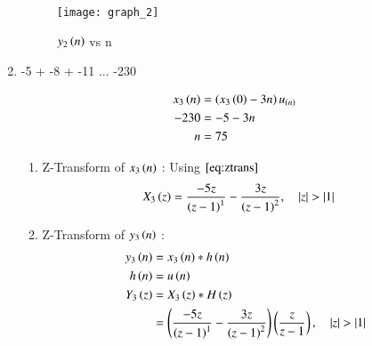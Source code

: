 \documentclass[journal,12pt,onecolumn]{IEEEtran}
\theoremstyle{remark}
\begin{document}
\begin{enumerate}
\begin{enumerate}
\end{enumerate}



\begin{figure}[h!]
\centering
  \graphicspath{ {figs/} }
\texttt{[image: graph\_2]}
\caption{$y_2\left(n\right)$ vs n }
\label{graph:ee25-g3}
\end{figure}

\vspace{0.5cm} 
\item
-5 + -8 + -11 ... -230
\vspace{0.5cm}

\begin{align}
x_3\left(n\right) &= \left(x_3\left(0\right) -3n\right)u_{\left(n\right)}\\
-230 &= -5 -3n \\
n &= 75
\end{align}
\begin{enumerate}
\item
Z-Transform of $x_3\left(n\right)$ :
Using $\eqref{eq:ztrans}$
\begin{align}
X_3\left(z\right) &=  \frac{-5z}{\left(z-1\right)^{1}} -
       \frac{3z}{\left(z-1\right)^{2}} \label{eq:ee25-8}
,\quad \left\vert z\right\vert>\left\vert1\right\vert 
\end{align}

    \vspace{0.5cm}
\item
Z-Transform of $y_3\left(n\right)$ :
\begin{align}
    y_3\left(n\right) &= x_3\left(n\right) * h\left(n\right) \\
         h\left(n\right) &= u\left(n\right) \\
    Y_3\left(z\right) &= X_3\left(z\right) * H\left(z\right)\\
             &= \left(\frac{-5z}{{\left(z-1\right)^1}}-
       \frac{3z}{\left(z-1\right)^2}\right)\left(\frac{z}{z-1}\right)
,\quad \left\vert z\right\vert>\left\vert1\right\vert 
    \end{align}


\end{enumerate}
\end{enumerate}
\end{document}
